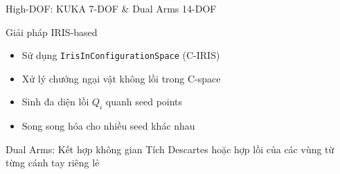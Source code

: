 \documentclass[aspectratio=169]{beamer}
\begin{document}
\begin{frame}{High-DOF: KUKA 7-DOF \& Dual Arms 14-DOF}


    \begin{block}{Giải pháp IRIS-based}
        \begin{itemize}
            \item Sử dụng \texttt{IrisInConfigurationSpace} (C-IRIS)
            \item Xử lý chướng ngại vật không lồi trong C-space
            \item Sinh đa diện lồi $Q_i$ quanh seed points
            \item Song song hóa cho nhiều seed khác nhau
        \end{itemize}
    \end{block}

    \begin{exampleblock}{Dual Arms: Kết hợp không gian}
        Tích Descartes hoặc hợp lồi của các vùng từ từng cánh tay riêng lẻ
    \end{exampleblock}

\end{frame}



\end{document}
